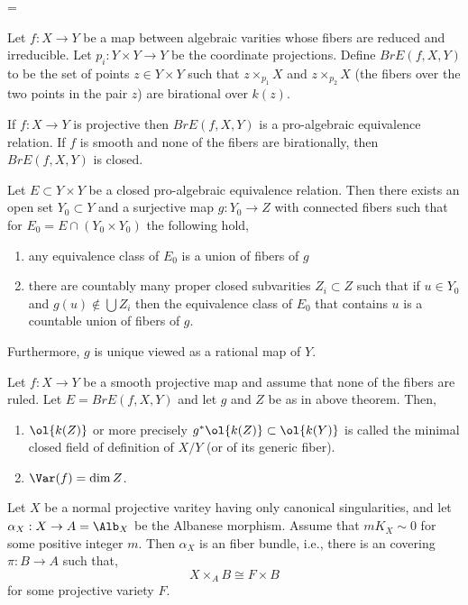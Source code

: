 =\documentclass[12pt]{article}
\begin{document}
\begin{defn}
Let $f : X \to Y$ be a map between algebraic varities whose fibers are reduced and irreducible. Let $p_i : Y \times Y \to Y$ be the coordinate projections. Define $Br E(f, X, Y)$ to be the set of points $z \in Y \times Y$ such that $z \times_{p_1} X$ and $z \times_{p_2} X$ (the fibers over the two points in the pair $z$) are birational over $k(z)$.
\end{defn}

\begin{prop}
If $f : X \to Y$ is projective then $Br E(f, X, Y)$ is a pro-algebraic equivalence relation. If $f$ is smooth and none of the fibers are birationally, then $Br E(f, X, Y)$ is closed. 
\end{prop}

\begin{theorem}
Let $E \subset Y \times Y$ be a closed pro-algebraic equivalence relation. Then there exists an open set $Y_0 \subset Y$ and a surjective map $g : Y_0 \to Z$ with connected fibers such that for $E_0 = E \cap (Y_0 \times Y_0)$ the following hold,
\begin{enumerate}
\item any equivalence class of $E_0$ is a union of fibers of $g$
\item there are countably many proper closed subvarities $Z_i \subset Z$
such that if $u \in Y_0$ and $g(u) \notin \bigcup Z_i$ then the equivalence class of $E_0$ that contains $u$ is a countable union of fibers of $g$.
\end{enumerate}
Furthermore, $g$ is unique viewed as a rational map of $Y$. 
\end{theorem}

\begin{prop}
Let $f : X \to Y$ be a smooth projective map and assume that none of the fibers are ruled. Let $E = Br E(f, X,Y)$ and let $g$ and $Z$ be as in above theorem. Then,
\begin{enumerate}
\item $\ol{k(Z)}$ or more precisely $g^* \ol{k(Z)} \subset \ol{k(Y)}$ is called the minimal closed field of definition of $X/Y$ (or of its generic fiber).
\item $\Var(f) = \dim{Z}$. 
\end{enumerate}
\end{prop}

\begin{prop}
Let $X$ be a normal projective varitey having only canonical singularities, and let $\alpha_X : X \to A = \Alb_X$ be the Albanese morphism. Assume that $m K_X \sim 0$ for some positive integer $m$. Then $\alpha_X$ is an \etale fiber bundle, i.e., there is an \etale covering $\pi : B \to A$ such that,
\[ X \times_A B \cong F \times B \]
for some projective variety $F$.
\end{prop}
\end{document}
